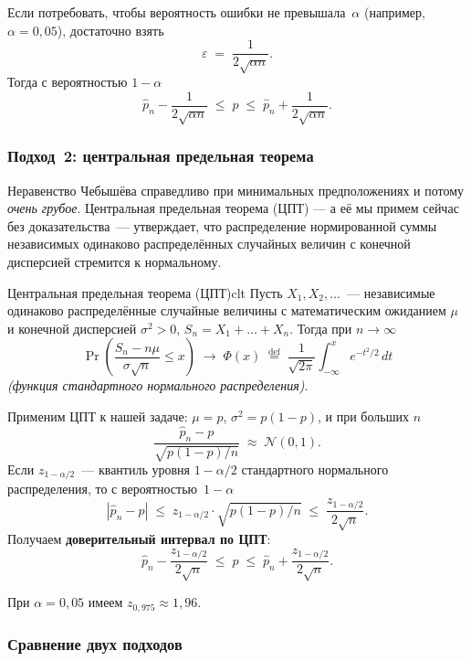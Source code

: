 Если потребовать, чтобы вероятность ошибки не превышала~$\alpha$ (например,
$\alpha=0{,}05$), достаточно взять
\[
\varepsilon\;=\;\frac{1}{2\sqrt{\alpha n}}.
\]
Тогда с вероятностью $1-\alpha$
\begin{equation}\label{eq:ci-cheb}
\hat p_n - \frac{1}{2\sqrt{\alpha n}}\;\leq\; p \;\leq\;
\hat p_n + \frac{1}{2\sqrt{\alpha n}}.
\end{equation}

\subsubsection*{Подход~2: центральная предельная теорема}

Неравенство Чебышёва справедливо при минимальных предположениях и потому
\emph{очень грубое}. Центральная предельная теорема (ЦПТ) — а её мы примем
сейчас без доказательства~--- утверждает, что распределение
нормированной суммы независимых одинаково распределённых случайных
величин с конечной дисперсией стремится к нормальному.

\begin{theorem}{Центральная предельная теорема (ЦПТ)}{clt}
Пусть $X_1,X_2,\dots$~--- независимые одинаково распределённые
случайные величины с математическим ожиданием $\mu$ и конечной
дисперсией $\sigma^2>0$, $S_n=X_1+\dots+X_n$. Тогда при $n\to\infty$
\[
\Pr\!\left(\frac{S_n-n\mu}{\sigma\sqrt n}\leq x\right)\;\longrightarrow\;
\Phi(x)\;\stackrel{\mathrm{def}}{=}\;\frac{1}{\sqrt{2\pi}}\int_{-\infty}^{x}
e^{-t^{2}/2}\,dt
\]
\emph{(функция стандартного нормального распределения)}.
\end{theorem}

Применим ЦПТ к нашей задаче: $\mu=p$, $\sigma^{2}=p(1-p)$, и при больших $n$
\[
\frac{\hat p_n - p}{\sqrt{p(1-p)/n}}\;\approx\;\mathcal N(0,1).
\]
Если $z_{1-\alpha/2}$~--- квантиль уровня $1-\alpha/2$ стандартного
нормального распределения, то с вероятностью~$1-\alpha$
\[
|\hat p_n-p|\;\leq\;z_{1-\alpha/2}\cdot\sqrt{p(1-p)/n}\;\leq\;
\frac{z_{1-\alpha/2}}{2\sqrt n}.
\]
Получаем \textbf{доверительный интервал по ЦПТ}:
\begin{equation}\label{eq:ci-clt}
\hat p_n - \frac{z_{1-\alpha/2}}{2\sqrt n}\;\leq\; p \;\leq\;
\hat p_n + \frac{z_{1-\alpha/2}}{2\sqrt n}.
\end{equation}

При $\alpha=0{,}05$ имеем $z_{0{,}975}\approx 1{,}96$.

\subsubsection*{Сравнение двух подходов}

